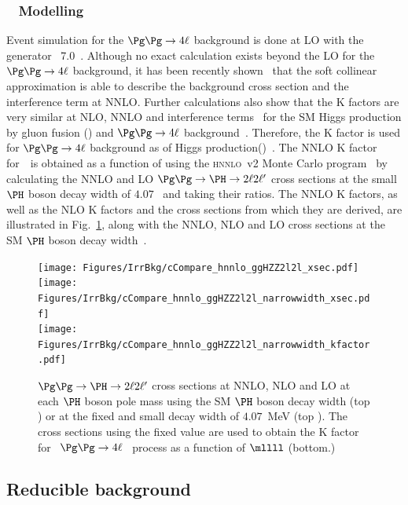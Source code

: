 \subsubsection{\ggZZ~ Modelling}

Event simulation for the $\ggZZ$ background is done at LO with the generator \MCFM~7.0~\cite{MCFM,Campbell:2011bn,Campbell:2013una}.
Although no exact calculation exists beyond the LO for the $\ggZZ$ background, 
it has been recently shown~\cite{Bonvini:1304.3053} 
that the soft collinear approximation is able to describe the background cross section and the 
interference term at NNLO\@. Further calculations also show that the K factors are very similar at NLO, 
NNLO and interference terms~\cite{Li:2015jva} for the SM Higgs production by gluon fusion (\ggH) and 
$\ggZZ$ background~\cite{Melnikov:2015laa}. Therefore, the K factor is used for $\ggZZ$ background as of
Higgs production(\ggH)~\cite{Passarino:1312.2397v1}. The NNLO K factor for~\ggH~is obtained as a function 
of \mass{4\ell}  using the \textsc{hnnlo}~v2 Monte Carlo 
program~\cite{Catani:2007vq,Grazzini:2008tf,Grazzini:2013mca} by calculating the NNLO and LO 
$\Pg\Pg\to\PH\to2\ell2\ell^\prime$ cross sections at the small $\PH$ boson decay width of $4.07$~\MeV 
and taking their ratios. The NNLO K factors, as 
well as the NLO K factors and the cross sections from which they are derived, are illustrated in Fig.~\ref{fig:ggHZZXsecKfactor}, 
along with the NNLO, NLO and LO cross sections at the SM $\PH$ boson decay width~\cite{Heinemeyer:2013tqa}.
 
\begin{figure}[!htb]
\centering
\texttt{[image: Figures/IrrBkg/cCompare\_hnnlo\_ggHZZ2l2l\_xsec.pdf]}
\texttt{[image: Figures/IrrBkg/cCompare\_hnnlo\_ggHZZ2l2l\_narrowwidth\_xsec.pdf]}\\
\texttt{[image: Figures/IrrBkg/cCompare\_hnnlo\_ggHZZ2l2l\_narrowwidth\_kfactor.pdf]}
\caption{$\Pg\Pg\to\PH\to2\ell2\ell^\prime$ cross sections at NNLO, NLO and LO at each $\PH$ boson pole mass using the SM $\PH$ boson decay width  (top \cmsLeft) or at the fixed and small decay width of $4.07$~MeV (top \cmsRight). The cross sections using the fixed value are used to obtain the K factor for ~$\ggZZ$~ process as a function of $\mllll$ (bottom.)}
\label{fig:ggHZZXsecKfactor}
\end{figure}


\subsection{Reducible background}
\label{sec:redbkgd}

